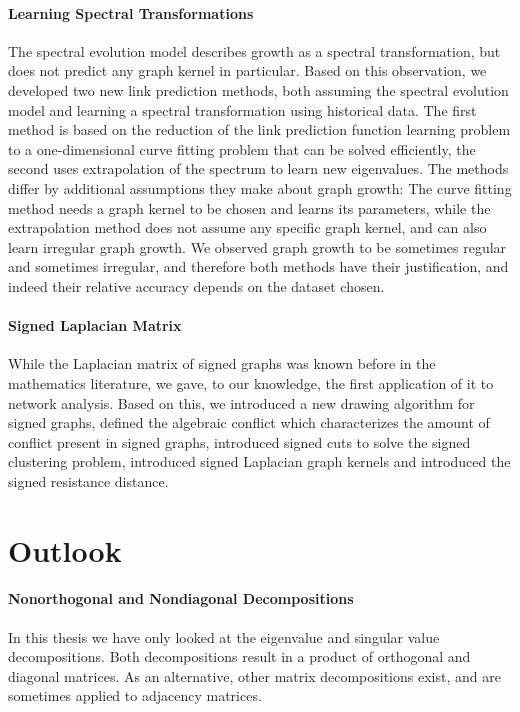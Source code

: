 \documentclass[11pt,a4paper]{book}
\begin{document}
\paragraph{Learning Spectral Transformations}
The spectral evolution model describes growth as a spectral
transformation, but does not predict any graph kernel in particular.
Based on this observation, we developed 
two new link prediction
methods, 
both assuming the spectral evolution model and learning a spectral
transformation using historical data.  The first method is based on
the reduction of the link prediction function learning problem to a
one-dimensional curve 
fitting problem that can be solved efficiently, the second uses
extrapolation of the spectrum to learn new eigenvalues.  The methods
differ by additional assumptions they make about graph growth:  The
curve fitting method needs a graph kernel to be chosen and learns its
parameters, while the extrapolation method does not assume any specific
graph kernel, and can also learn irregular graph growth.  We observed
graph growth to be sometimes regular and sometimes irregular, and
therefore both methods have their justification, and indeed their
relative accuracy depends on the dataset chosen. 

\paragraph{Signed Laplacian Matrix}
While the Laplacian matrix of signed graphs was known before in the
mathematics literature, we gave, to our knowledge, the first application
of it to network analysis. 
Based on this, we introduced a new drawing algorithm for signed graphs,
defined the algebraic conflict which characterizes the amount of
conflict present in signed graphs, introduced signed cuts to solve the
signed clustering problem, introduced signed Laplacian graph kernels and
introduced the signed resistance distance. 

\section{Outlook}

\paragraph{Nonorthogonal and Nondiagonal Decompositions}
In this thesis we have only looked at the eigenvalue and singular value
decompositions.  Both decompositions result in a product of orthogonal
and diagonal matrices.  As an alternative, other matrix decompositions
exist, and are sometimes applied to adjacency matrices.  
\end{document}
